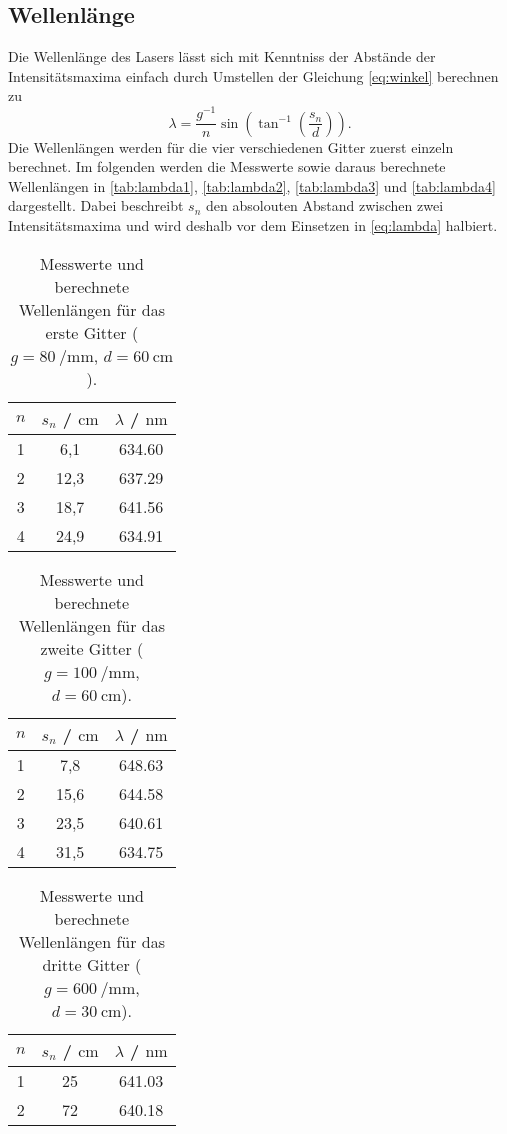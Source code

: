 \subsection{Wellenlänge}
Die Wellenlänge des Lasers lässt sich mit Kenntniss der Abstände der Intensitätsmaxima einfach durch
Umstellen der Gleichung \eqref{eq:winkel} berechnen zu
\begin{equation}
  \label{eq:lambda}
  \lambda = \frac{g^{-1}}{n} \sin\left(\tan^{-1}\left(\frac{s_n}{d}\right)\right).
\end{equation}
Die Wellenlängen werden für die vier verschiedenen Gitter zuerst einzeln berechnet.
Im folgenden werden die Messwerte sowie daraus berechnete Wellenlängen in \autoref{tab:lambda1}, \autoref{tab:lambda2},
\autoref{tab:lambda3} und \autoref{tab:lambda4} dargestellt.
Dabei beschreibt $s_n$ den absolouten Abstand zwischen zwei Intensitätsmaxima und wird deshalb vor dem Einsetzen in
\eqref{eq:lambda} halbiert.
\begin{table}[H]
  \centering
  \begin{tabular}{c|c|c}
    $n$ & $s_n$ / $\unit{\centi\metre}$& $\lambda$ / $\unit{\nano\metre}$ \\
    \hline
    1 & 6,1 & 634.60 \\
    2 & 12,3 & 637.29 \\
    3 & 18,7 & 641.56 \\
    4 & 24,9 & 634.91
  \end{tabular}
  \caption{Messwerte und berechnete Wellenlängen für das erste Gitter ($g=\qty{80}{\per\milli\metre}$, $d=\qty{60}{\centi\metre}$).}
\label{tab:lambda1}
\end{table}
\begin{table}[H]
  \centering
  \begin{tabular}{c|c|c}
    $n$ & $s_n$ / $\unit{\centi\metre}$& $\lambda$ / $\unit{\nano\metre}$ \\
    \hline
    1 & 7,8 & 648.63 \\
    2 & 15,6 & 644.58 \\
    3 & 23,5 & 640.61 \\
    4 & 31,5 & 634.75
  \end{tabular}
  \caption{Messwerte und berechnete Wellenlängen für das zweite Gitter ($g=\qty{100}{\per\milli\metre}$, $d=\qty{60}{\centi\metre}$).}
\label{tab:lambda2}
\end{table}
\begin{table}[H]
  \centering
  \begin{tabular}{c|c|c}
    $n$ & $s_n$ / $\unit{\centi\metre}$& $\lambda$ / $\unit{\nano\metre}$ \\
    \hline
    1 & 25 & 641.03 \\
    2 & 72 & 640.18
  \end{tabular}
  \caption{Messwerte und berechnete Wellenlängen für das dritte Gitter ($g=\qty{600}{\per\milli\metre}$, $d=\qty{30}{\centi\metre}$).}
\label{tab:lambda3}
\end{table}
